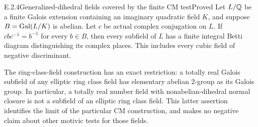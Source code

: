 \begin{result}{E.2.4}{Generalized-dihedral fields covered by the finite CM test}{Proved}
Let $L/\mathbb Q$ be a finite Galois extension containing an imaginary quadratic field $K$, and suppose $B=\operatorname{Gal}(L/K)$ is abelian. Let $c$ be actual complex conjugation on $L$. If $cbc^{-1}=b^{-1}$ for every $b\in B$, then every subfield of $L$ has a finite integral Betti diagram distinguishing its complex places. This includes every cubic field of negative discriminant.

The ring-class-field construction has an exact restriction: a totally real Galois subfield of any elliptic ring class field has elementary abelian $2$-group as its Galois group. In particular, a totally real number field with nonabelian-dihedral normal closure is not a subfield of an elliptic ring class field. This latter assertion identifies the limit of the particular CM construction, and makes no negative claim about other motivic tests for those fields.
\end{result}
